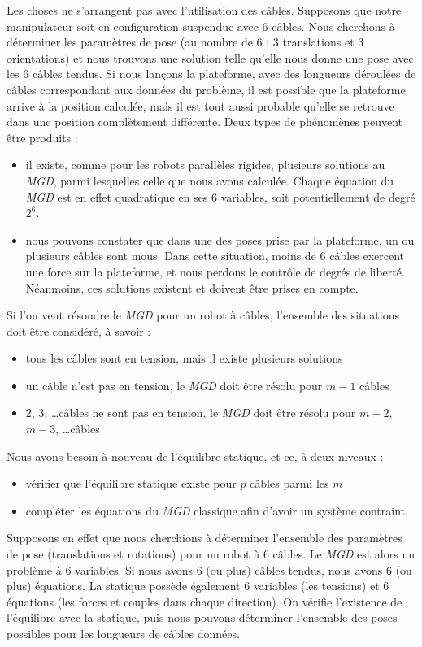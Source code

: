 Les choses ne s'arrangent pas avec l'utilisation des câbles. Supposons que notre manipulateur soit en configuration suspendue avec $6$ câbles. Nous cherchons à déterminer les paramètres de pose (au nombre de $6$ : $3$ translations et $3$ orientations) et nous trouvons une solution telle qu'elle nous donne une pose avec les $6$ câbles tendus. Si nous lançons la plateforme, avec des longueurs déroulées de câbles correspondant aux données du problème, il est possible que la plateforme arrive à la position calculée, mais il est tout aussi probable qu'elle se retrouve dans une position complètement différente. Deux types de phénomènes peuvent être produits :
\begin{itemize}
 \item il existe, comme pour les robots parallèles rigides, plusieurs solutions au {\it MGD}, parmi lesquelles celle que nous avons calculée. Chaque équation du {\it MGD} est en effet quadratique en ses $6$ variables, soit potentiellement de degré $2^6$. 
 \item nous pouvons constater que dans une des poses prise par la plateforme, un ou plusieurs câbles sont mous. Dans cette situation, moins de 6 câbles exercent une force sur la plateforme, et nous perdons le contrôle de degrés de liberté. Néanmoins, ces solutions existent et doivent être prises en compte.
\end{itemize}

Si l'on veut résoudre le {\it MGD} pour un robot à câbles, l'ensemble des situations doit être considéré, à savoir :
\begin{itemize}
 \item tous les câbles sont en tension, mais il existe plusieurs solutions
 \item un câble n'est pas en tension, le {\it MGD} doit être résolu pour $m-1$ câbles
 \item 2, 3, \dots câbles ne sont pas en tension, le {\it MGD} doit être résolu pour $m-2$, $m-3$, \dots câbles
\end{itemize}

Nous avons besoin à nouveau de l'équilibre statique, et ce, à deux niveaux :
\begin{itemize}
 \item vérifier que l'équilibre statique existe pour $p$ câbles parmi les $m$
 \item compléter les équations du {\it MGD} classique afin d'avoir un système contraint.
\end{itemize}

Supposons en effet que nous cherchions à déterminer l'ensemble des paramètres de pose (translations et rotations) pour un robot à $6$ câbles. Le {\it MGD} est alors un problème à $6$ variables. Si nous avons 6 (ou plus) câbles tendus, nous avons $6$ (ou plus) équations. La statique possède également $6$ variables (les tensions) et $6$ équations (les forces et couples dans chaque direction). On vérifie l'existence de l'équilibre avec la statique, puis nous pouvons déterminer l'ensemble des poses possibles pour les longueurs de câbles données.

